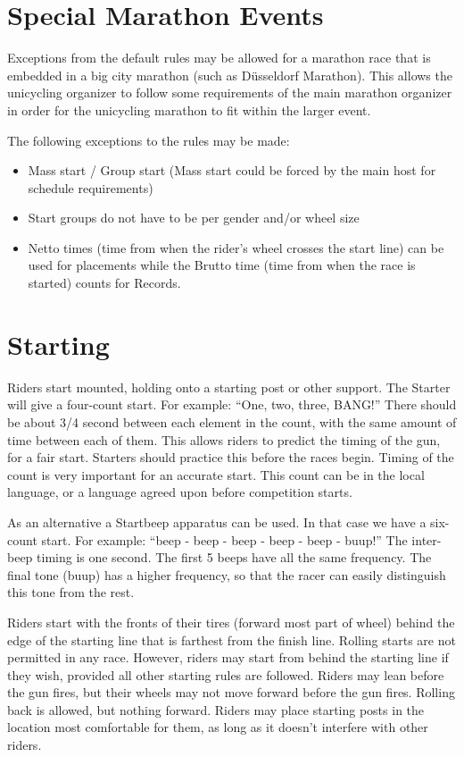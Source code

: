 \section{Special Marathon Events}
Exceptions from the default rules may be allowed for a marathon race that is embedded in a big city marathon (such as D{\"u}sseldorf Marathon).
This allows the unicycling organizer to follow some requirements of the main marathon organizer in order for the unicycling marathon to fit within the larger event.

The following exceptions to the rules may be made:
\begin{itemize}
\item Mass start / Group start (Mass start could be forced by the main host for schedule requirements) 
\item Start groups do not have to be per gender and/or wheel size
\item Netto times (time from when the rider's wheel crosses the start line) can be used for placements while the Brutto time (time from when the race is started) counts for Records.
\end{itemize}

\section{Starting}
Riders start mounted, holding onto a starting post or other support.
The Starter will give a four-count start.
For example: ``One, two, three, BANG!''
There should be about 3/4 second between each element in the count, with the same amount of time between each of them.
This allows riders to predict the timing of the gun, for a fair start.
Starters should practice this before the races begin.
Timing of the count is very important for an accurate start.
This count can be in the local language, or a language agreed upon before competition starts.

As an alternative a Startbeep apparatus can be used.
In that case we have a six-count start.
For example: ``beep - beep - beep - beep - beep - buup!''
The inter-beep timing is one second.
The first 5 beeps have all the same frequency.
The final tone (buup) has a higher frequency, so that the racer can easily distinguish this tone from the rest.

Riders start with the fronts of their tires (forward most part of wheel) behind the edge of the starting line that is farthest from the finish line.
Rolling starts are not permitted in any race.
However, riders may start from behind the starting line if they wish, provided all other starting rules are followed.
Riders may lean before the gun fires, but their wheels may not move forward before the gun fires.
Rolling back is allowed, but nothing forward.
Riders may place starting posts in the location most comfortable for them, as long as it doesn't interfere with other riders.

